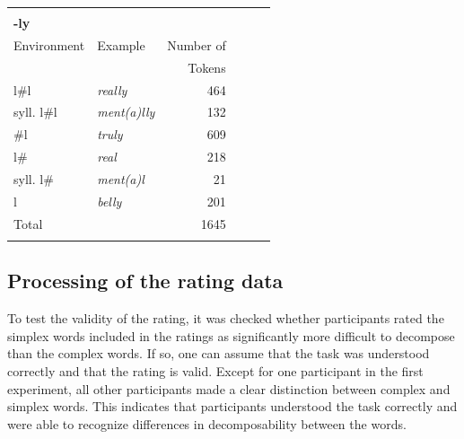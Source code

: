 \begin{table}[]
{\begin{tabular} {llrllr}
			& & & \\
			\textbf{-ly}&&& & & \\
			\midrule	%
			Environment & Example & Number of & & & \\
						 &  & Tokens & & & \\
			\midrule
			l\#l &\color[HTML]{3166FF}\textit{really} & 464 & & & \\ 
			syll. l\#l &\color[HTML]{3166FF}\textit{ment(a)lly} & 132 & & & \\ 
			\#l &\color[HTML]{3166FF}\textit{truly} & 609& & & \\ 
			l\# &\color[HTML]{3166FF}\textit{real} & 218& & & \\ 
			syll. l\#&\color[HTML]{3166FF}\textit{ment(a)l} &21& & &\\ 
			l &\color[HTML]{3166FF}\textit{belly} & 201& & & \\ 
			\midrule   	
			Total&  &1645 & & & \\ 

			\midrule& & & 
		\end{tabular}
	}
	
\end{table}



\subsection{Processing of the rating data} \label{Processing of the Rating Data}


To test the validity of the rating, it was checked whether participants rated the simplex words included in the ratings as significantly more difficult to decompose than the complex words. If so, one can assume that the task was understood correctly and that the rating is valid. 
Except for one participant in the first experiment, all other participants made a clear distinction between complex and simplex words. This indicates that participants understood the task correctly and were able to recognize differences in decomposability between the words.

